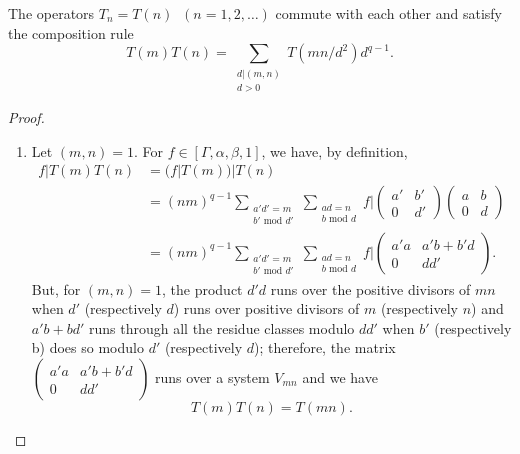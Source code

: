 \begin{thm}\label{chap5:thm38}
The operators $T_n=T(n) \;\; (n=1,2,\ldots)$ commute with each other and
satisfy the composition rule 
$$
T(m) T(n) = \sum_{\substack{d|(m,n)\\d>0}} T(mn/d^2) d^{q-1}.
$$
\end{thm}

\begin{proof}
\begin{enumerate}
\renewcommand{\theenumi}{\roman{enumi}}
\renewcommand{\labelenumi}{(\theenumi)}
\item Let $(m,n)=1$. For $f\in [\Gamma, \alpha, \beta, 1]$, we
  have, by definition, 
\begin{align*}
f|T(m) T(n) & = (f|T(m))|T(n)\\
& = (nm)^{q-1} \sum_{\substack{a'd'=m\\b'\text{ mod  }d'}}
\sum_{\substack{ad=n\\b\text{ mod } d}} f|\begin{pmatrix}
a'&b'\\0&d'
\end{pmatrix} \begin{pmatrix}
a&b\\0&d
\end{pmatrix}\\
& = (nm)^{q-1} \sum_{\substack{a'd' =m\\b'\text{ mod }d'}}
\sum_{\substack{ad=n\\b\text{ mod }d}} f|\begin{pmatrix}
a'a & a'b+b'd\\
0 & dd'
\end{pmatrix}.
\end{align*}
But, for $(m,n)=1$, the product $d'd$ runs over the positive divisors
of $mn$ when $d'$ (respectively $d$) runs over positive divisors of
$m$ (respectively $n$) and $a'b+bd'$ runs through all the residue
classes modulo $dd'$ when $b'$ (respectively b) does so modulo $d'$
(respectively $d$); therefore, the matrix
$\left(\begin{smallmatrix} a'a& a'b+b'd\\ 0 &
  dd' \end{smallmatrix}\right)$ runs over a system $V_{mn}$ and we
have
$$
T(m) T(n) = T(mn).
$$


\end{enumerate}
\end{proof}
